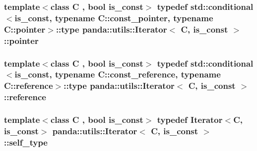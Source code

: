 \hypertarget{classpanda_1_1utils_1_1Iterator_aad1c0f1ec4ce6fd567b46880b66769bf}{
\subsubsection[{pointer}]{\setlength{\rightskip}{0pt plus 5cm}template$<$class C , bool is\_\-const$>$ typedef std::conditional$<$is\_\-const, typename C::const\_\-pointer, typename C::pointer$>$::type {\bf panda::utils::Iterator}$<$ C, is\_\-const $>$::{\bf pointer}}}
\label{classpanda_1_1utils_1_1Iterator_aad1c0f1ec4ce6fd567b46880b66769bf}
\hypertarget{classpanda_1_1utils_1_1Iterator_ac4ac97c60dc57aa24e36695240855a5c}{
\subsubsection[{reference}]{\setlength{\rightskip}{0pt plus 5cm}template$<$class C , bool is\_\-const$>$ typedef std::conditional$<$is\_\-const, typename C::const\_\-reference, typename C::reference$>$::type {\bf panda::utils::Iterator}$<$ C, is\_\-const $>$::{\bf reference}}}
\label{classpanda_1_1utils_1_1Iterator_ac4ac97c60dc57aa24e36695240855a5c}
\hypertarget{classpanda_1_1utils_1_1Iterator_a683ab6aa3c6fc4e12338d13e9e2f9694}{
\subsubsection[{self\_\-type}]{\setlength{\rightskip}{0pt plus 5cm}template$<$class C , bool is\_\-const$>$ typedef {\bf Iterator}$<$C, is\_\-const$>$ {\bf panda::utils::Iterator}$<$ C, is\_\-const $>$::{\bf self\_\-type}}}
\label{classpanda_1_1utils_1_1Iterator_a683ab6aa3c6fc4e12338d13e9e2f9694}



